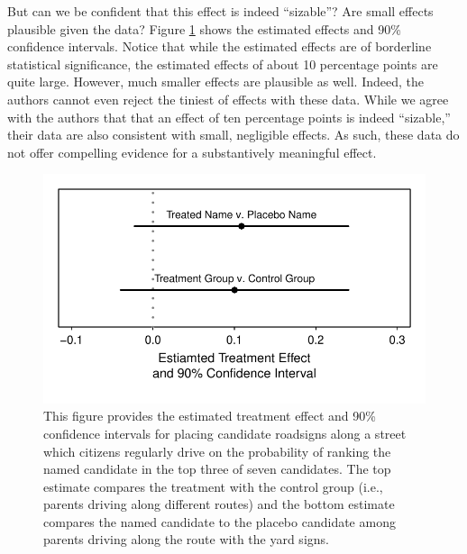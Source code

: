 \documentclass[12pt]{article}
\begin{document}
\begin{appendix}
But can we be confident that this effect is indeed ``sizable''? Are small effects plausible given the data? Figure \ref{fig:kz-ci} shows the estimated effects and 90\% confidence intervals. Notice that while the estimated effects are of borderline statistical significance, the estimated effects of about 10 percentage points are quite large. However, much smaller effects are plausible as well. Indeed, the authors cannot even reject the tiniest of effects with these data. While we agree with the authors that that an effect of ten percentage points is indeed ``sizable,'' their data are also consistent with small, negligible effects. As such, these data do not offer compelling evidence for a substantively meaningful effect.

\begin{figure}[H]
\begin{center}
\includegraphics[scale = .8]{figs/kz-ci.pdf}
\caption{This figure provides the estimated treatment effect and 90\% confidence intervals for placing candidate roadsigns along a street which citizens regularly drive on the probability of ranking the named candidate in the top three of seven candidates. The top estimate compares the treatment with the control group (i.e., parents driving along different routes) and the bottom estimate compares the named candidate to the placebo candidate among parents driving along the route with the yard signs.}\label{fig:kz-ci}
\end{center}
\end{figure}


\end{appendix}
\end{document}
